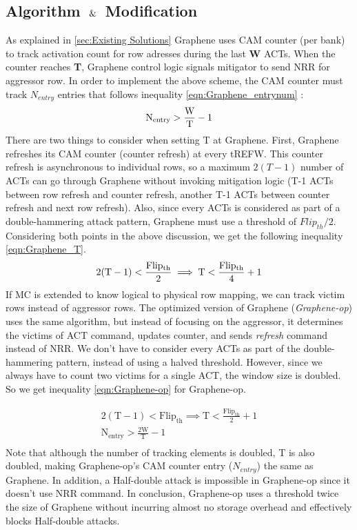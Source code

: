 \subsection{Algorithm $\And$ Modification}
\label{sec:Graphene Modification}
As explained in \ref{sec:Existing Solutions} Graphene uses CAM counter (per bank) to track activation count for 
row adresses during the last \textbf{W} ACTs. When the counter reaches \textbf{T}, Graphene control logic signals mitigator to send NRR
for aggressor row. In order to implement the above scheme, the CAM counter must track $N_{entry}$ entries that follows inequality 
\ref{eqn:Graphene_entrynum} \cite{Graphene}:
\begin{equation}
\mathrm{N_{entry} >\frac{W}{T} - 1} \\
\label{eqn:Graphene_entrynum} 
\end{equation}
There are two things to consider when setting T at Graphene. First, Graphene refreshes its CAM counter (counter refresh) at every tREFW. 
This counter refresh is asynchronous to individual rows, so a maximum  $2(T-1)$ number of ACTs can go through Graphene without invoking 
mitigation logic (T-1 ACTs between row refresh and counter refresh, another T-1 ACTs between counter refresh and next row refresh). 
Also, since every ACTs is considered as part of a double-hammering attack pattern, Graphene must use a threshold of $Flip_{th}/2$. 
Considering both points in the above discussion, we get the following inequality \ref{eqn:Graphene_T}.
\begin{equation}
\mathrm{2(T-1) <\frac{Flip_{th}}{2} \implies T<\frac{Flip_{th}}{4}+1} \\
\label{eqn:Graphene_T} 
\end{equation}
If MC is extended to know logical to physical row mapping, we can track victim rows instead of aggressor rows. 
The optimized version of Graphene (\textit{Graphene-op}) uses the same algorithm, but instead of focusing on the aggressor, it determines
the victims of ACT command, updates counter, and sends \textit{refresh} command instead of NRR. We don't have to consider every ACTs 
as part of the double-hammering pattern, instead of using a halved threshold. However, since we always have to count two victims 
for a single ACT, the window size is doubled. So we get inequality \ref{eqn:Graphene-op} for Graphene-op.

\begin{equation}
\label{eqn:Graphene-op} 
\begin{gathered}
\mathrm{2(T-1) <Flip_{th} \implies T<\frac{Flip_{th}}{2}+1} \\
\mathrm{N_{entry} >\frac{2W}{T} - 1} \\
\end{gathered}
\end{equation}
Note that although the number of tracking elements is doubled, T is also doubled, making Graphene-op's CAM counter entry ($N_{entry}$) 
the same as Graphene. In addition, a Half-double attack is impossible in Graphene-op since it doesn't use NRR command. 
In conclusion, Graphene-op uses a threshold twice the size of Graphene without incurring almost no storage overhead and 
effectively blocks Half-double attacks. 


